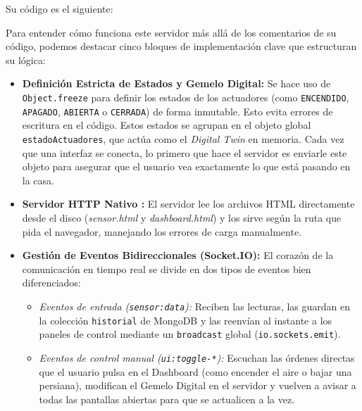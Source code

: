 \documentclass[a4paper,12pt]{article}
\begin{document}
				Su código es el siguiente:
				
				
				Para entender cómo funciona este servidor más allá de los comentarios de su código, podemos destacar cinco bloques de implementación clave que estructuran su lógica:
				
				\begin{itemize}
					\item \textbf{Definición Estricta de Estados y Gemelo Digital:} Se hace uso de \texttt{Object.freeze} para definir los estados de los actuadores (como \texttt{ENCENDIDO}, \texttt{APAGADO}, \texttt{ABIERTA} o \texttt{CERRADA}) de forma inmutable. Esto evita errores de escritura en el código. Estos estados se agrupan en el objeto global \texttt{estadoActuadores}, que actúa como el \textit{Digital Twin} en memoria. Cada vez que una interfaz se conecta, lo primero que hace el servidor es enviarle este objeto para asegurar que el usuario vea exactamente lo que está pasando en la casa.
					
					\item \textbf{Servidor HTTP Nativo :} El servidor lee los archivos HTML directamente desde el disco (\textit{sensor.html} y \textit{dashboard.html}) y los sirve según la ruta que pida el navegador, manejando los errores de carga manualmente.
					
					\item \textbf{Gestión de Eventos Bidireccionales (Socket.IO):} El corazón de la comunicación en tiempo real se divide en dos tipos de eventos bien diferenciados:
					\begin{itemize}
						\item \textit{Eventos de entrada (\texttt{sensor:data}):} Reciben las lecturas, las guardan en la colección \texttt{historial} de MongoDB y las reenvían al instante a los paneles de control mediante un \texttt{broadcast} global (\texttt{io.sockets.emit}).
						
						\item \textit{Eventos de control manual (\texttt{ui:toggle-*}):} Escuchan las órdenes directas que el usuario pulsa en el Dashboard (como encender el aire o bajar una persiana), modifican el Gemelo Digital en el servidor y vuelven a avisar a todas las pantallas abiertas para que se actualicen a la vez.
					\end{itemize}
					

\end{itemize}
\end{document}
